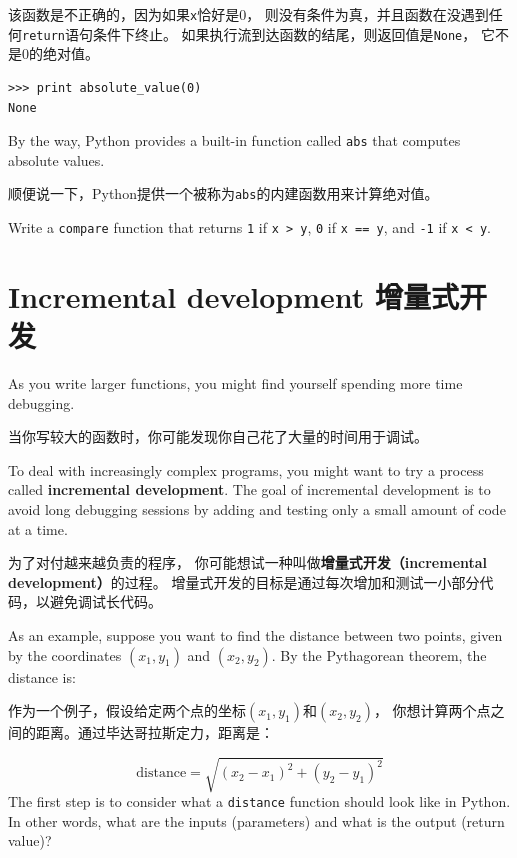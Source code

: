 \documentclass[10pt]{book}
\begin{document}
\begin{CJK}{UTF8}{gbsn}
该函数是不正确的，因为如果{\tt x}恰好是0，
则没有条件为真，并且函数在没遇到任何{\tt return}语句条件下终止。
如果执行流到达函数的结尾，则返回值是{\tt None}，
它不是0的绝对值。

\begin{verbatim}
>>> print absolute_value(0)
None
\end{verbatim}
%
By the way, Python provides a built-in function called 
{\tt abs} that computes absolute values.

顺便说一下，Python提供一个被称为{\tt abs}的内建函数用来计算绝对值。

\begin{exercise}

Write a {\tt compare} function
that returns {\tt 1} if {\tt x > y},
{\tt 0} if {\tt x == y}, and {\tt -1} if {\tt x < y}.
\end{exercise}


\section{Incremental development 增量式开发}
\label{incremental.development}

As you write larger functions, you might find yourself
spending more time debugging.

当你写较大的函数时，你可能发现你自己花了大量的时间用于调试。

To deal with increasingly complex programs,
you might want to try a process called
{\bf incremental development}.  The goal of incremental development
is to avoid long debugging sessions by adding and testing only
a small amount of code at a time.

为了对付越来越负责的程序，
你可能想试一种叫做{\bf 增量式开发（incremental development）}的过程。
增量式开发的目标是通过每次增加和测试一小部分代码，以避免调试长代码。

As an example, suppose you want to find the distance between two
points, given by the coordinates $(x_1, y_1)$ and $(x_2, y_2)$.
By the Pythagorean theorem, the distance is:

作为一个例子，假设给定两个点的坐标$(x_1, y_1)$和$(x_2, y_2)$，
你想计算两个点之间的距离。通过毕达哥拉斯定力，距离是：

\begin{displaymath}
\mathrm{distance} = \sqrt{(x_2 - x_1)^2 + (y_2 - y_1)^2}
\end{displaymath}
%
The first step is to consider what a {\tt distance} function should
look like in Python.  In other words, what are the inputs (parameters)
and what is the output (return value)?


\end{CJK}
\end{document}
